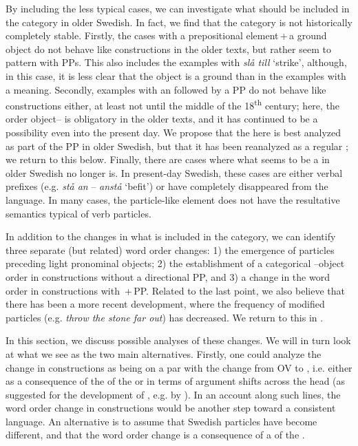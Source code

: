\documentclass[output=paper]{langscibook}
\begin{document}
By including the less typical cases, we can investigate what should be included in the  category in older Swedish. In fact, we find that the category is not historically completely stable. Firstly, the cases with a prepositional element\,+\,a ground object do not behave like  constructions in the older texts, but rather seem to pattern with PPs. This also includes the examples with \textit{slå till} ‘strike’, although, in this case, it is less clear that the object is a ground than in the examples with a  meaning. Secondly, examples with an  followed by a PP do not behave like  constructions either, at least not until the middle of the 18\textsuperscript{th} century; here, the order object– is obligatory in the older texts, and it has continued to be a possibility even into the present day. We propose that the  here is best analyzed as part of the PP in older Swedish, but that it has been reanalyzed as a regular ; we return to this below. Finally, there are cases where what seems to be a  in older Swedish no longer is. In present-day Swedish, these cases are either verbal prefixes (e.g. \textit{stå an} – \textit{anstå} ‘befit’) or have completely disappeared from the language. In many cases, the particle-like element does not have the resultative semantics typical of verb particles. 



In addition to the changes in what is included in the  category, we can identify three separate (but related) word order changes: 1) the emergence of particles preceding light pronominal objects; 2) the establishment of a categorical –object order in constructions without a directional PP, and 3) a change in the word order in constructions with \,+\,PP. Related to the last point, we also believe that there has been a more recent development, where the frequency of modified particles (e.g. \textit{throw the stone far out}) has decreased. We return to this in .



In this section, we discuss possible analyses of these changes. We will in turn look at what we see as the two main alternatives. Firstly, one could analyze the change in  constructions as being on a par with the change from OV to , i.e. either as a consequence of the  of the  or in terms of argument shifts across the  head (as suggested for the development of , e.g. by \citealt{Petzell2011}). In an account along such lines, the word order change in  constructions would be another step toward a consistent  language. An alternative is to assume that Swedish particles have become different, and that the word order change is a consequence of a  of the . 
\end{document}
